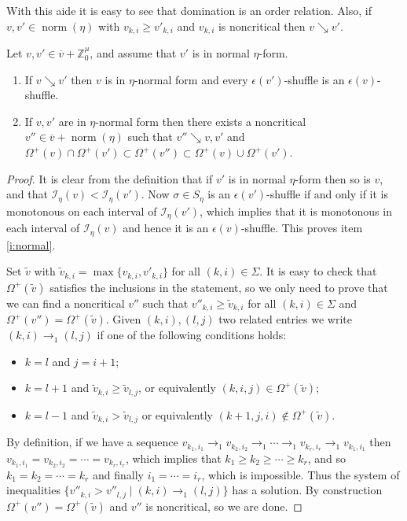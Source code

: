 \documentclass[11pt,fleqn]{article}
\newcommand\ZZ{\mathbb Z}
\newcommand\I{\mathcal I}
\DeclareMathOperator\n{norm}
\begin{document}
With this aide it is easy to see that domination is an order relation. Also, 
if $v, v' \in \n(\eta)$ with $v_{k,i} \geq v'_{k,i}$ and $v_{k,i}$ is 
noncritical then $v \searrow v'$.

\begin{Lemma*}
Let $v,v' \in \overline v + \ZZ^\mu_0$, and assume that $v'$ is in normal
$\eta$-form. 
\begin{enumerate}
\item 
\label{i:normal}
If $v \searrow v'$ then $v$ is in $\eta$-normal form and every 
$\epsilon(v')$-shuffle is an $\epsilon(v)$-shuffle.

\item
\label{i:common}
If $v, v'$ are in $\eta$-normal form then there exists a noncritical $v''
\in \overline v + \n(\eta)$ such that $v'' \searrow v, v'$ and 
$\Omega^+(v) \cap \Omega^+(v') \subset \Omega^+(v'') \subset \Omega^+(v) \cup 
\Omega^+(v')$. 
\end{enumerate}
\end{Lemma*}
\begin{proof}
It is clear from the definition that if $v'$ is in normal $\eta$-form then
so is $v$, and that $\I_\eta(v) < \I_\eta(v')$. Now $\sigma \in S_\eta$
is an $\epsilon(v')$-shuffle if and only if it is monotonous on each interval
of $\I_\eta(v')$, which implies that it is monotonous in each interval of 
$\I_\eta(v)$ and hence it is an $\epsilon(v)$-shuffle. This proves item 
\ref{i:normal}.

Set $\tilde v$ with $\tilde v_{k,i} = \max\{v_{k,i}, v'_{k,i}\}$ for all $(k,i)
\in \Sigma$. It is easy to check that $\Omega^+(\tilde v)$ satisfies the
inclusions in the statement, so we only need to prove that we can find a 
noncritical $v''$ such that $v''_{k,i} \geq \tilde v_{k,i}$ for all $(k,i)
\in \Sigma$ and $\Omega^+(v'') = \Omega^+(\tilde v)$. Given $(k,i), (l,j)$
two related entries we write $(k,i) \rightarrow_1 (l,j)$ if one of the 
following conditions holds:
\begin{itemize}
\item $k = l$ and $j = i+1$;
\item $k = l+1$ and $\tilde v_{k,i} \geq \tilde v_{l,j}$, or equivalently 
$(k,i,j) \in \Omega^+(\tilde v)$;
\item $k = l-1$ and $\tilde v_{k,i} > \tilde v_{l,j}$ or equivalently 
$(k+1,j,i) \notin \Omega^+(\tilde v)$.
\end{itemize}
By definition, if we have a sequence $v_{k_1,i_1} \rightarrow_1 v_{k_2, i_2}
\rightarrow_1 \cdots \rightarrow_1 v_{k_r, i_r} \rightarrow_1 v_{k_1, i_1}$
then $v_{k_1, i_1} = v_{k_2, i_2} = \cdots = v_{k_r,i_r}$, which implies that
$k_1 \geq k_2 \geq \cdots \geq k_r$, and so $k_1 = k_2 = \cdots = k_r$ and
finally $i_1 = \cdots = i_r$, which is impossible. Thus the system of 
inequalities $\{v''_{k,i} > v''_{l,j} \mid(k,i) \rightarrow_1 
(l,j)\}$ has a solution. By construction $\Omega^+(v'') = \Omega^+(\tilde v)$
and $v''$ is noncritical, so we are done.
\end{proof}
\end{document}
